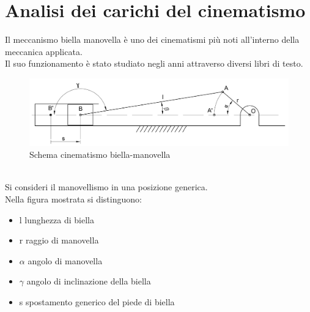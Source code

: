 \section{Analisi dei carichi del cinematismo}
Il meccanismo biella manovella è uno dei cinematismi più noti all’interno della meccanica applicata. \\
Il suo funzionamento è stato studiato negli anni attraverso diversi libri di testo. \\
\begin{figure}[h]
    \centering
    \includegraphics[scale=0.4]{Immagini/Cinematismo.png}
    \caption{Schema cinematismo biella-manovella}
    \label{fig:Cinematismo}
\end{figure}
\\
Si consideri il manovellismo in una posizione generica. \\
Nella figura mostrata si distinguono:
\begin{itemize}
   \item l lunghezza di biella 
   \item r raggio di manovella 
   \item $\alpha$ angolo di manovella 
	\item $\gamma$ angolo di inclinazione della biella 
	\item s spostamento generico del piede di biella 
\end{itemize}
